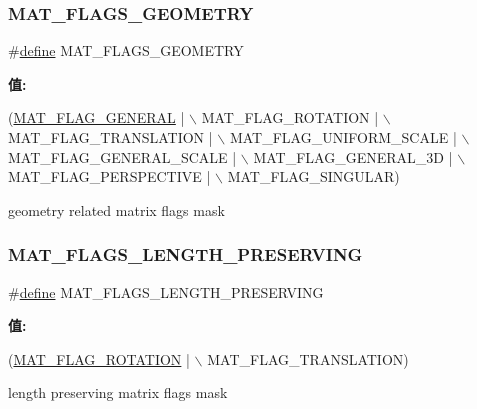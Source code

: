 \subsubsection{\texorpdfstring{M\+A\+T\+\_\+\+F\+L\+A\+G\+S\+\_\+\+G\+E\+O\+M\+E\+T\+RY}{MAT\_FLAGS\_GEOMETRY}}
{\footnotesize\ttfamily \#\hyperlink{structdefine}{define} M\+A\+T\+\_\+\+F\+L\+A\+G\+S\+\_\+\+G\+E\+O\+M\+E\+T\+RY}

{\bfseries 值\+:}
\begin{DoxyCode}
(\hyperlink{group___mat_flags_gafbc6bb67558ead333d77b39078073f43}{MAT\_FLAG\_GENERAL} | \(\backslash\)
                MAT\_FLAG\_ROTATION | \(\backslash\)
                MAT\_FLAG\_TRANSLATION | \(\backslash\)
                MAT\_FLAG\_UNIFORM\_SCALE | \(\backslash\)
                MAT\_FLAG\_GENERAL\_SCALE | \(\backslash\)
                MAT\_FLAG\_GENERAL\_3D | \(\backslash\)
                MAT\_FLAG\_PERSPECTIVE | \(\backslash\)
                        MAT\_FLAG\_SINGULAR)
\end{DoxyCode}
geometry related matrix flags mask \mbox{\label{group___mat_flags_ga1ff6f6732ace580b20fb74607bc94d15}} 
\subsubsection{\texorpdfstring{M\+A\+T\+\_\+\+F\+L\+A\+G\+S\+\_\+\+L\+E\+N\+G\+T\+H\+\_\+\+P\+R\+E\+S\+E\+R\+V\+I\+NG}{MAT\_FLAGS\_LENGTH\_PRESERVING}}
{\footnotesize\ttfamily \#\hyperlink{structdefine}{define} M\+A\+T\+\_\+\+F\+L\+A\+G\+S\+\_\+\+L\+E\+N\+G\+T\+H\+\_\+\+P\+R\+E\+S\+E\+R\+V\+I\+NG}

{\bfseries 值\+:}
\begin{DoxyCode}
(\hyperlink{group___mat_flags_ga3dd0c612ad9a4c9c4ed5e2ff0e879368}{MAT\_FLAG\_ROTATION} | \(\backslash\)
                     MAT\_FLAG\_TRANSLATION)
\end{DoxyCode}
length preserving matrix flags mask 